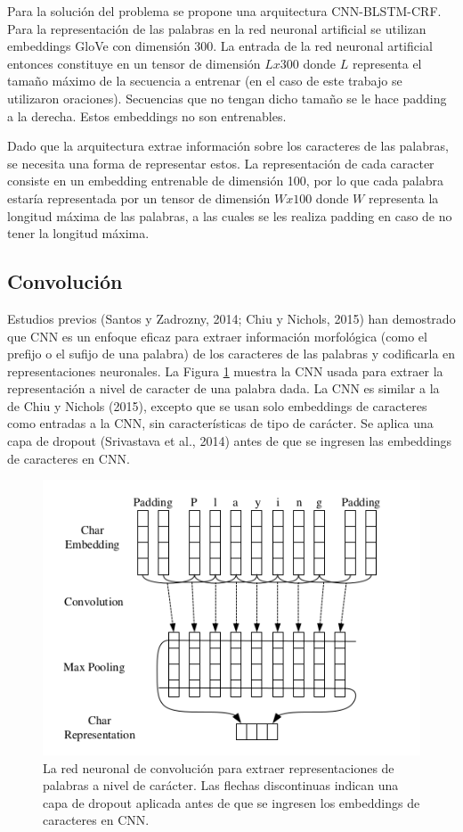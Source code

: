 \documentclass[runningheads]{llncs}
\begin{document}
Para la solución del problema se propone una arquitectura CNN-BLSTM-CRF. Para la representación
de las palabras en la red neuronal artificial se utilizan embeddings GloVe con dimensión 300.
La entrada de la red neuronal artificial entonces constituye en un tensor de dimensión 
$Lx300$ donde $L$ representa el tamaño máximo de la secuencia a entrenar (en el caso de este trabajo
se utilizaron oraciones). Secuencias que no tengan dicho tamaño se le hace padding a la derecha. 
Estos embeddings no son entrenables.

Dado que la arquitectura extrae información sobre los caracteres de las palabras, se necesita
una forma de representar estos. La representación de cada caracter consiste en un embedding
entrenable de dimensión 100, por lo que cada palabra estaría representada por un tensor de
dimensión $Wx100$ donde $W$ representa la longitud máxima de las palabras, a las cuales se
les realiza padding en caso de no tener la longitud máxima.

\subsection{Convolución}

Estudios previos (Santos y Zadrozny, 2014; Chiu y Nichols, 2015) han demostrado que CNN es un 
enfoque eficaz para extraer información morfológica (como el prefijo o el sufijo de una palabra) 
de los caracteres de las palabras y codificarla en representaciones neuronales. La Figura \ref{F1} muestra 
la CNN usada para extraer la representación a nivel de caracter de una palabra dada. La CNN 
es similar a la de Chiu y Nichols (2015), excepto que se usan solo embeddings de caracteres como 
entradas a la CNN, sin características de tipo de carácter. Se aplica una capa de dropout
(Srivastava et al., 2014) antes de que se ingresen las embeddings de caracteres en CNN.

\begin{figure}
	\centering
	\includegraphics[width=12cm]{Fig_1.png}
	\caption{ La red neuronal de convolución para extraer representaciones de palabras 
	a nivel de carácter. Las flechas discontinuas indican una capa de dropout aplicada antes 
	de que se ingresen los embeddings de caracteres en CNN.}
	\label{F1}
\end{figure}
\end{document}
